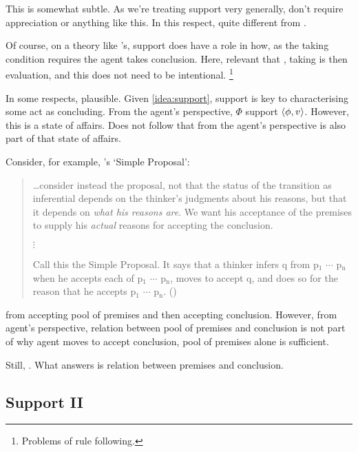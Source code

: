 \begin{note}
  This is somewhat subtle.
  As we're treating support very generally, don't require appreciation or anything like this.
  In this respect, quite different from \citeauthor{Boghossian:2014aa}.

  Of course, on a theory like \citeauthor{Boghossian:2014aa}'s, support does have a role in how, as the taking condition requires the agent takes conclusion.
  Here, relevant that \support{}, taking is then evaluation, and this does not need to be intentional.%
  \footnote{
    Problems of rule following.
  }

  In some respects, plausible.
  Given \autoref{idea:support}, support is key to characterising some act as concluding.
  From the agent's perspective, \(\Phi\) support \(\langle \phi, v \rangle\).
  However, this is a state of affairs.
  Does not follow that \support{} from the agent's perspective is also part of that state of affairs.

  Consider, for example, \citeauthor{Wright:2014tt}'s `Simple Proposal':
  \begin{quote}
    \dots consider instead the proposal, not that the status of the transition as inferential depends on the thinker's judgments about his reasons, but that it depends on \emph{what his reasons are}.
    We want his acceptance of the premises to supply his \emph{actual} reasons for accepting the conclusion.

    \mbox{}\hfill\(\vdots\)\hfill\mbox{}

    Call this the Simple Proposal.
    It says that a thinker infers q from p\(_{1}\) \(\cdots\) p\(_{\text{n}}\) when he accepts each of p\(_{1}\) \(\cdots\) p\(_{\text{n}}\), moves to accept q, and does so for the reason that he accepts p\(_{1}\) \(\cdots\) p\(_{\text{n}}\).\newline
    \mbox{}\hfill\mbox{(\citeyear[33]{Wright:2014tt})}
  \end{quote}

   from accepting pool of premises and then accepting conclusion.
  However, from agent's perspective, relation between pool of premises and conclusion is not part of why agent moves to accept conclusion, pool of premises alone is sufficient.

  Still, \support{}.
  What answers is relation between premises and conclusion.
\end{note}

\subsection{Support II}

